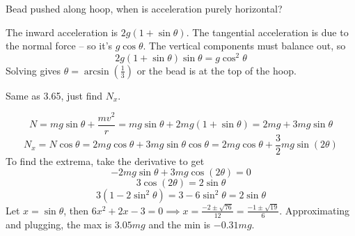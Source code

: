 \documentclass[11pt]{scrartcl}
\begin{document}
\begin{example}
  [3.64]
\end{example}
\begin{soln}
\end{soln}
\begin{example}
  [3.65]
  Bead pushed along hoop, when is acceleration purely horizontal?
\end{example}
\begin{soln}
  The inward acceleration is $2g(1+\sin\theta)$. The tangential acceleration
  is due to the normal force -- so it's $g\cos\theta$. The vertical components
  must balance out, so
  $$2g(1+\sin\theta)\sin\theta=g\cos^2\theta$$
  Solving gives $\theta=\arcsin\left(\frac{1}{3}\right)$ or the bead is at the
  top of the hoop.
\end{soln}
\begin{example}
  [3.66]
  Same as 3.65, just find $N_x$.
\end{example}
\begin{soln}
  $$N=mg\sin\theta+\frac{mv^2}{r}=mg\sin\theta+2mg(1+\sin\theta)=2mg+3mg\sin\theta$$
  $$N_x=N\cos\theta=2mg\cos\theta+3mg\sin\theta\cos\theta=2mg\cos\theta+\frac{3}{2}mg\sin(2\theta)$$
  To find the extrema, take the derivative to get
  $$-2mg\sin\theta+3mg\cos(2\theta)=0$$
  $$3\cos(2\theta)=2\sin\theta$$
  $$3(1-2\sin^2\theta)=3-6\sin^2\theta=2\sin\theta$$
  Let $x=\sin\theta$, then $6x^2+2x-3=0\implies x=\frac{-2\pm \sqrt{76}}{12}=\frac{-1\pm \sqrt{19}}{6}$.
  Approximating and plugging, the max is $3.05mg$ and the min is $-0.31mg$.
\end{soln}
\end{document}
